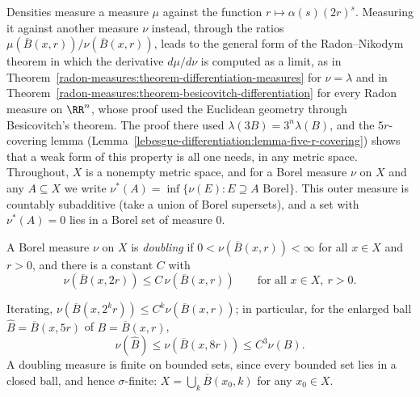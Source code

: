 Densities measure a measure $\mu$ against the function $r \mapsto \alpha(s)(2r)^s$. Measuring it against another measure $\nu$ instead, through the ratios $\mu(\overline{B}(x, r))/\nu(\overline{B}(x, r))$,
leads to the general form of the Radon--Nikodym theorem in which the derivative $d\mu/d\nu$ is computed as a limit, as in Theorem~\ref{radon-measures:theorem-differentiation-measures} for
$\nu = \lambda$ and in Theorem~\ref{radon-measures:theorem-besicovitch-differentiation} for every Radon measure on $\RR^n$, whose proof used the Euclidean geometry through Besicovitch's theorem. The proof there used $\lambda(3B) = 3^n\lambda(B)$, and the $5r$-covering lemma (Lemma~\ref{lebesgue-differentiation:lemma-five-r-covering}) shows that a weak form of this property is all one
needs, in any metric space. Throughout, $X$ is a nonempty metric space, and for a Borel measure $\nu$ on $X$ and any $A \subseteq X$ we write $\nu^*(A) = \inf\{\nu(E) : E \supseteq A \text{ Borel}\}$.
This outer measure is countably subadditive (take a union of Borel supersets), and a set with $\nu^*(A) = 0$ lies in a Borel set of measure $0$.

\begin{definition}\label{radon-measures:definition-doubling}
A Borel measure $\nu$ on $X$ is \emph{doubling} if $0 < \nu(\overline{B}(x, r)) < \infty$ for all $x \in X$ and $r > 0$, and there is a constant $C$ with
\[
\nu(\overline{B}(x, 2r)) \leq C\,\nu(\overline{B}(x, r)) \qquad \text{for all } x \in X,\ r > 0 .
\]
\end{definition}

Iterating, $\nu(\overline{B}(x, 2^kr)) \leq C^k\nu(\overline{B}(x, r))$; in particular, for the enlarged ball $\widehat{B} = \overline{B}(x, 5r)$ of $B = \overline{B}(x, r)$,
\begin{equation}\label{radon-measures:equation-doubling-five}
\nu(\widehat{B}) \leq \nu(\overline{B}(x, 8r)) \leq C^3\nu(B) .
\end{equation}
A doubling measure is finite on bounded sets, since every bounded set lies in a closed ball, and hence $\sigma$-finite: $X = \bigcup_k\overline{B}(x_0, k)$ for any $x_0 \in X$.

